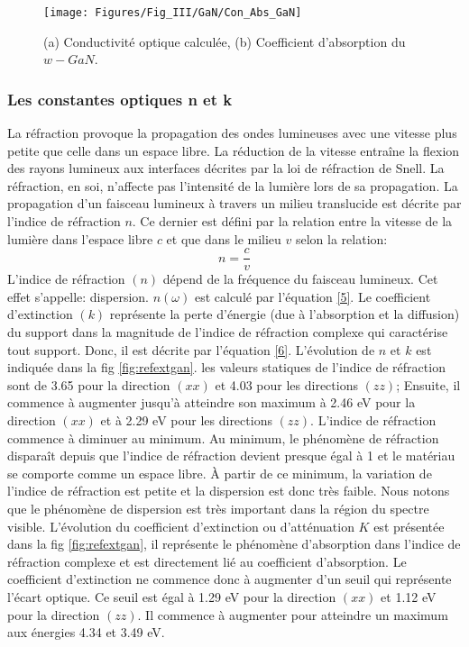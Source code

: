 \begin{figure}[h!]
	\centering
	\texttt{[image: Figures/Fig\_III/GaN/Con\_Abs\_GaN]}
	\caption{(a) Conductivité optique calculée, (b) Coefficient d'absorption du $w-GaN$.}
	\label{fig:conabsgan}
\end{figure}

\FloatBarrier

\subsubsection{Les constantes optiques n et k}

La réfraction provoque la propagation des ondes lumineuses avec une vitesse plus petite que celle dans un espace libre. La réduction de la vitesse entraîne la flexion des rayons lumineux aux interfaces décrites par la loi de réfraction de Snell. La réfraction, en soi, n'affecte pas l'intensité de la lumière lors de sa propagation. La propagation d'un faisceau lumineux à travers un milieu translucide est décrite par l'indice de réfraction $ n $. Ce dernier est défini par la relation entre la vitesse de la lumière dans l'espace libre $ c $ et que dans le milieu $ v $ selon la relation:
\begin{equation}\label{11}
	n=\dfrac{c}{v}
\end{equation}
L'indice de réfraction $ (n) $ dépend de la fréquence du faisceau lumineux. Cet effet s'appelle: dispersion. $ n(\omega) $ est calculé par l'équation \eqref{5}. Le coefficient d'extinction $ (k) $ représente la perte d'énergie (due à l'absorption et la diffusion) du support dans la magnitude de l'indice de réfraction complexe qui caractérise tout support. Donc, il est décrite par l'équation \eqref{6}. L'évolution de $ n $ et $ k $ est indiquée dans la fig \ref{fig:refextgan}. les valeurs statiques de l'indice de réfraction sont de 3.65 pour la direction $ (xx) $ et 4.03 pour les directions $ (zz) $; Ensuite, il commence à augmenter jusqu'à atteindre son maximum à 2.46 eV pour la direction $ (xx) $ et à 2.29 eV pour les directions $ (zz) $. L'indice de réfraction commence à diminuer au minimum. Au minimum, le phénomène de réfraction disparaît depuis que l'indice de réfraction devient presque égal à 1 et le matériau se comporte comme un espace libre. À partir de ce minimum, la variation de l'indice de réfraction est petite et la dispersion est donc très faible. Nous notons que le phénomène de dispersion est très important dans la région du spectre visible. L'évolution du coefficient d'extinction ou d'atténuation $ K $ est présentée dans la fig \ref{fig:refextgan}, il représente le phénomène d'absorption dans l'indice de réfraction complexe et est directement lié au coefficient d'absorption. Le coefficient d'extinction ne commence donc à augmenter d'un seuil qui représente l'écart optique. Ce seuil est égal à 1.29 eV pour la direction $ (xx) $ et 1.12 eV pour la direction $ (zz) $. Il commence à augmenter pour atteindre un maximum aux énergies 4.34 et 3.49 eV.

